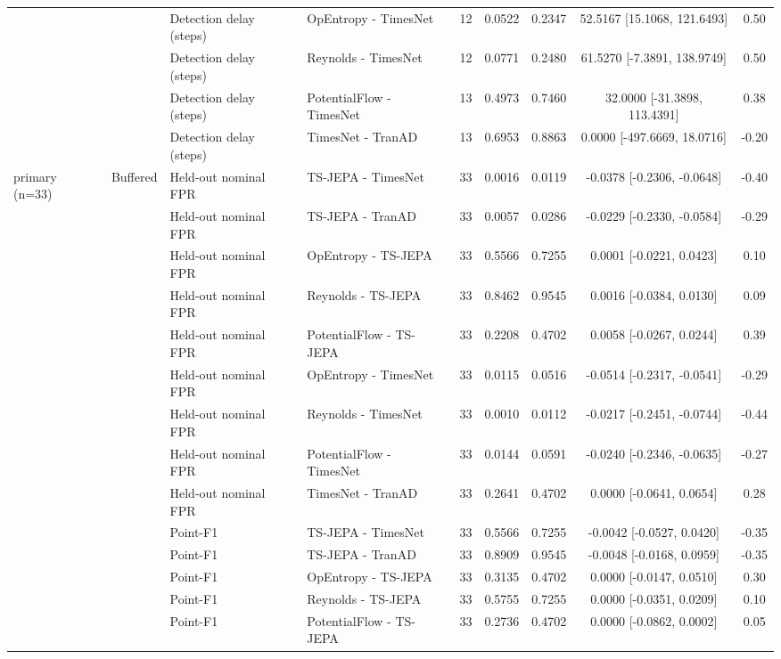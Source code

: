 {\begin{longtable}{@{}llllccccc@{}}
 &  & Detection delay (steps) & OpEntropy - TimesNet & 12 & 0.0522 & 0.2347 & 52.5167 [15.1068, 121.6493] & 0.50 \\
 &  & Detection delay (steps) & Reynolds - TimesNet & 12 & 0.0771 & 0.2480 & 61.5270 [-7.3891, 138.9749] & 0.50 \\
 &  & Detection delay (steps) & PotentialFlow - TimesNet & 13 & 0.4973 & 0.7460 & 32.0000 [-31.3898, 113.4391] & 0.38 \\
 &  & Detection delay (steps) & TimesNet - TranAD & 13 & 0.6953 & 0.8863 & 0.0000 [-497.6669, 18.0716] & -0.20 \\
\midrule
primary (n=33) & Buffered & Held-out nominal FPR & TS-JEPA - TimesNet & 33 & 0.0016 & 0.0119 & -0.0378 [-0.2306, -0.0648] & -0.40 \\
 &  & Held-out nominal FPR & TS-JEPA - TranAD & 33 & 0.0057 & 0.0286 & -0.0229 [-0.2330, -0.0584] & -0.29 \\
 &  & Held-out nominal FPR & OpEntropy - TS-JEPA & 33 & 0.5566 & 0.7255 & 0.0001 [-0.0221, 0.0423] & 0.10 \\
 &  & Held-out nominal FPR & Reynolds - TS-JEPA & 33 & 0.8462 & 0.9545 & 0.0016 [-0.0384, 0.0130] & 0.09 \\
 &  & Held-out nominal FPR & PotentialFlow - TS-JEPA & 33 & 0.2208 & 0.4702 & 0.0058 [-0.0267, 0.0244] & 0.39 \\
 &  & Held-out nominal FPR & OpEntropy - TimesNet & 33 & 0.0115 & 0.0516 & -0.0514 [-0.2317, -0.0541] & -0.29 \\
 &  & Held-out nominal FPR & Reynolds - TimesNet & 33 & 0.0010 & 0.0112 & -0.0217 [-0.2451, -0.0744] & -0.44 \\
 &  & Held-out nominal FPR & PotentialFlow - TimesNet & 33 & 0.0144 & 0.0591 & -0.0240 [-0.2346, -0.0635] & -0.27 \\
 &  & Held-out nominal FPR & TimesNet - TranAD & 33 & 0.2641 & 0.4702 & 0.0000 [-0.0641, 0.0654] & 0.28 \\
 &  & Point-F1 & TS-JEPA - TimesNet & 33 & 0.5566 & 0.7255 & -0.0042 [-0.0527, 0.0420] & -0.35 \\
 &  & Point-F1 & TS-JEPA - TranAD & 33 & 0.8909 & 0.9545 & -0.0048 [-0.0168, 0.0959] & -0.35 \\
 &  & Point-F1 & OpEntropy - TS-JEPA & 33 & 0.3135 & 0.4702 & 0.0000 [-0.0147, 0.0510] & 0.30 \\
 &  & Point-F1 & Reynolds - TS-JEPA & 33 & 0.5755 & 0.7255 & 0.0000 [-0.0351, 0.0209] & 0.10 \\
 &  & Point-F1 & PotentialFlow - TS-JEPA & 33 & 0.2736 & 0.4702 & 0.0000 [-0.0862, 0.0002] & 0.05 \\

\end{longtable}}
